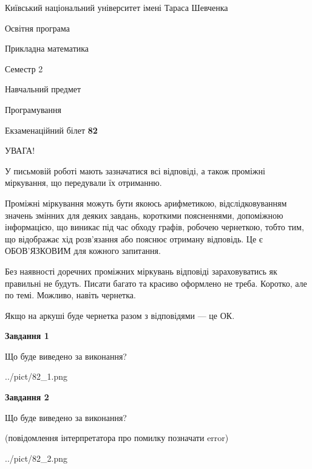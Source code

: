 \documentclass[12pt, ukrainian]{article}
\begin{document}
{{\begin {small}\par
{ \center  Київський національний університет імені Тараса Шевченка \par}
{\parbox {5 cm}{Освітня програма \hfill}{\parbox {7 cm}{Прикладна математика\hfill}}\parbox {6 cm}{\hfill Семестр 2}}\par
{\parbox {5 cm} {Навчальний предмет \hfill}\parbox {7 cm}{Програмування \hfill}\parbox {6cm}{\hfill}\par}\vspace{-7pt} \end{small}}{\center Екзаменаційний білет \No \textbf
{ 82 }\par}}
{
\begin {large}
УВАГА!

У письмовій роботі мають зазначатися всі відповіді, а також проміжні міркування, що передували їх отриманню.

Проміжні міркування можуть бути якоюсь арифметикою, відслідковуванням зна\-чень змінних для деяких завдань,
короткими поясненнями, допоміжною інформацією, що виникає під час обходу графів, робочею чернеткою,
тобто тим, що відображає хід розв’язання або пояснює отриману відповідь.
Це є ОБОВ’ЯЗКОВИМ для кожного запитання.

Без наявності доречних проміжних міркувань відповіді зараховуватись як правиль\-ні не будуть.
Писати багато та красиво оформлено не треба. Коротко, але по темі. Можли\-во, навіть чернетка.

Якщо на аркуші буде чернетка разом з відповідями --- це ОК.

\newpage

{\begin {center}\textbf{Завдання 1}\end {center}}\par
Що буде виведено за виконання?\par
\begin{center}
	{../pict/82_1.png}
\end{center}
\newpage

{\begin {center}\textbf{Завдання 2}\end {center}}\par
Що буде виведено за виконання?\par
 (повідомлення інтерпретатора про помилку позначати error)\par
\begin{center}
	{../pict/82_2.png}
\end{center}
\newpage


\end{large}}
\end{document}
